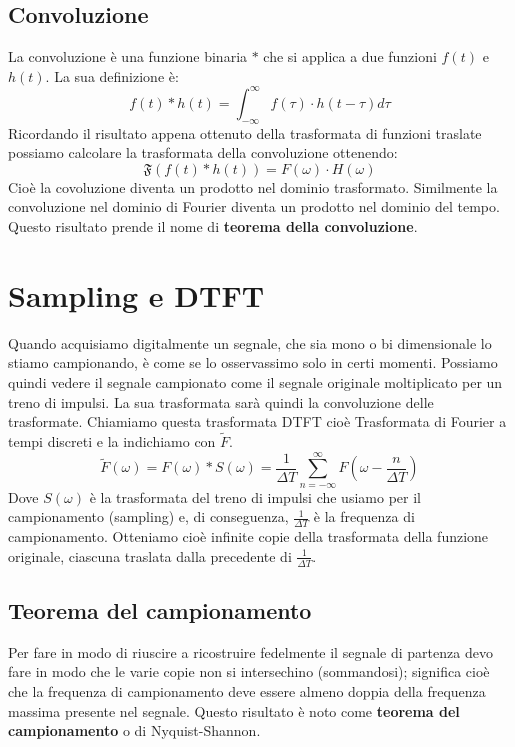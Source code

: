 \subsection{Convoluzione}
La convoluzione è una funzione binaria $*$ che si applica a due funzioni $f(t)$ e $h(t)$. La sua definizione è:
\begin{equation}
	f(t)*h(t) = \int_{-\infty}^{\infty} f(\tau) \cdot h(t - \tau) d\tau
\end{equation}
Ricordando il risultato appena ottenuto della trasformata di funzioni traslate possiamo calcolare la trasformata della convoluzione ottenendo:
\begin{equation}
	\mathfrak{F}(f(t) * h(t)) = F(\omega)\cdot H(\omega)
\end{equation}
Cioè la covoluzione diventa un prodotto nel dominio trasformato. Similmente la convoluzione nel dominio di Fourier diventa un prodotto nel dominio del tempo. Questo risultato prende il nome di \textbf{teorema della convoluzione}.

\section{Sampling e DTFT}
Quando acquisiamo digitalmente un segnale, che sia mono o bi dimensionale lo stiamo campionando, è come se lo osservassimo solo in certi momenti. Possiamo quindi vedere il segnale campionato come il segnale originale moltiplicato per un treno di impulsi. La sua trasformata sarà quindi la convoluzione delle trasformate. Chiamiamo questa trasformata DTFT cioè Trasformata di Fourier a tempi discreti e la indichiamo con $\tilde{F}$.
\begin{equation}
	\tilde{F}(\omega) = F(\omega) * S(\omega) = \frac{1}{\Delta T} \sum_{n = -\infty}^{\infty} F(\omega - \frac{n}{\Delta T})
\end{equation}
Dove $S(\omega)$ è la trasformata del treno di impulsi che usiamo per il campionamento (sampling) e, di conseguenza, $\frac{1}{\Delta T}$ è la frequenza di campionamento. Otteniamo cioè infinite copie della trasformata della funzione originale, ciascuna traslata dalla precedente di $\frac{1}{\Delta T}$. 
\subsection{Teorema del campionamento}
Per fare in modo di riuscire a ricostruire fedelmente il segnale di partenza devo fare in modo che le varie copie non si intersechino (sommandosi); significa cioè che la frequenza di campionamento deve essere almeno doppia della frequenza massima presente nel segnale. Questo risultato è noto come \textbf{teorema del campionamento} o di Nyquist-Shannon.

